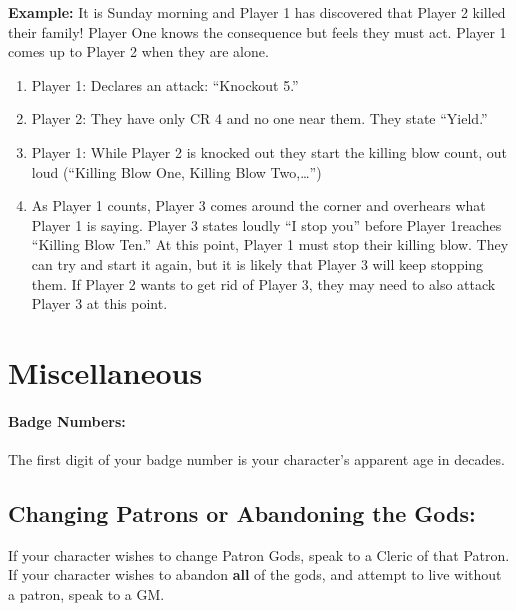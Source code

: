 \documentclass[sheet]{GL2020}
\begin{document}
\textbf{Example:}\newline
It is Sunday morning and Player 1 has discovered that Player 2 killed their family! Player One knows the consequence but feels they must act. Player 1 comes up to Player 2 when they are alone. 
\begin{enumerate}
	\item Player 1: Declares an attack: ``Knockout 5.'' 
	\item Player 2: They have only CR 4 and no one near them. They state ``Yield.''
	\item Player 1: While Player 2 is knocked out they start the killing blow count, out loud (``Killing Blow One, Killing Blow Two,\ldots'')
	\item As Player 1 counts, Player 3 comes around the corner and overhears what Player 1 is saying. Player 3 states loudly ``I stop you'' before Player 1reaches ``Killing Blow Ten.'' At this point, Player 1 must stop their killing blow. They can try and start it again, but it is likely that Player 3 will keep stopping them. If Player 2 wants to get rid of Player 3, they may need to also attack Player 3 at this point.
\end{enumerate}

\section{Miscellaneous}

\paragraph{Badge Numbers:} The first digit of your badge number is your character's apparent age in decades.

\subsection{Changing Patrons or Abandoning the Gods:}
If your character wishes to change Patron Gods, speak to a Cleric of that Patron. If your character wishes to abandon \textbf{all} of the gods, and attempt to live without a patron, speak to a GM.
\end{document}
